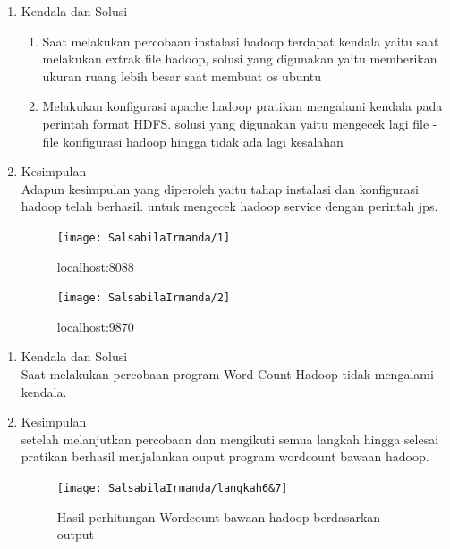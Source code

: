 
\begin{enumerate}
\item Kendala dan Solusi\\
\begin{enumerate}
\item Saat melakukan percobaan instalasi hadoop terdapat kendala yaitu saat melakukan extrak file hadoop, solusi yang digunakan yaitu memberikan ukuran ruang lebih besar saat membuat os ubuntu
\item Melakukan konfigurasi apache hadoop pratikan mengalami kendala pada perintah format HDFS. solusi yang digunakan yaitu mengecek lagi file - file konfigurasi hadoop hingga tidak ada lagi kesalahan
\end{enumerate}

\item Kesimpulan \\
Adapun kesimpulan yang diperoleh yaitu tahap instalasi dan konfigurasi hadoop telah berhasil. untuk mengecek hadoop service dengan perintah jps.
\begin{figure}[!ht]
\texttt{[image: SalsabilaIrmanda/1]}
\caption{localhost:8088}
\label{gam:perkuliahan-22-09}
\end{figure}

\newpage
\begin{figure}[!ht]
\texttt{[image: SalsabilaIrmanda/2]}
\caption{localhost:9870}
\label{gam:perkuliahan-22-09}
\end{figure}
\end{enumerate}


\begin{enumerate}
\item Kendala dan Solusi \\
Saat melakukan percobaan program Word Count Hadoop tidak mengalami kendala. 
\item Kesimpulan \\
setelah melanjutkan percobaan dan mengikuti semua langkah hingga selesai pratikan berhasil menjalankan ouput program wordcount bawaan hadoop. 

\begin{figure}[!ht]
\texttt{[image: SalsabilaIrmanda/langkah6\&7]}
\caption{Hasil perhitungan Wordcount bawaan hadoop berdasarkan output}
\label{gam:perkuliahan-08-12}
\end{figure}
\end{enumerate}


